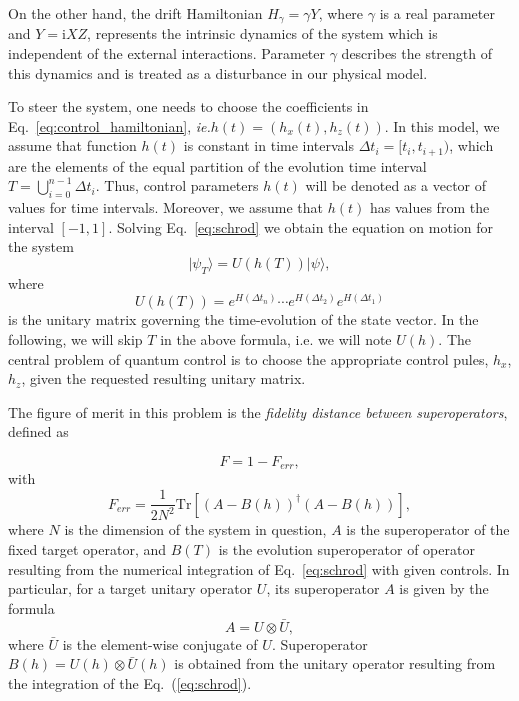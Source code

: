 \documentclass[aps,pra,showkeys,showpacs,notitlepage,superscriptaddress]{revtex4-1}
\newcommand{\Tr}{\mathrm{Tr}}
\newcommand{\tr}{\Tr}
\newcommand{\ket}[1]{\ensuremath{|#1\rangle}}
\newcommand{\1}{{\rm 1\hspace{-0.9mm}l}}
\newcommand{\ii}{\mathrm{i}}
\newcommand{\Sx}{X}
\newcommand{\Sz}{Z}
\newcommand{\Sy}{Y}
\newcommand{\ie}{\emph{ie.}\xspace}
\begin{document}
On the other hand, the drift Hamiltonian $H_{\gamma}=\gamma \Sy$, where 
$\gamma$ is a real parameter and  $\Sy=\ii\Sx \Sz$, represents the 
intrinsic dynamics of the system which is independent of the external 
interactions. Parameter $\gamma$ describes the strength of this dynamics and  is treated as a disturbance in 
our physical model.

To steer the system, one needs to choose the coefficients in 
Eq.~\eqref{eq:control_hamiltonian}, \ie $h(t) 
= (h_x(t),h_z(t))$. In this model, we assume that 
function $h(t)$ is constant in time intervals $\Delta t_i = 
[t_i,t_{i+1})$, which are the elements of the equal partition of the evolution time interval $T 
=\bigcup_{i=0}^{n-1}\Delta t_i$. Thus, control parameters $h(t)$ will be denoted as a vector of values for time 
intervals. Moreover, we assume that $h(t)$ has values 
from the interval $[ -1,1]$. 
Solving Eq.~\eqref{eq:schrod} we obtain the equation on motion for the system
\begin{equation}
\ket{\psi_T}=U(h(T))\ket{\psi},
\end{equation}
where
\begin{equation}
U(h(T))=e^{ H(\Delta t_n)}\cdots e^{ H(\Delta t_2)}e^{ H(\Delta t_1)}
\label{eq:integrate_superoperator}
\end{equation}
is the unitary matrix governing the time-evolution of the state vector. In the following, we will skip $T$ in the above formula, i.e. we will note $U(h)$. 
The central problem of quantum control is to choose the appropriate control 
pules, $h_x$, $h_z$, given the requested resulting unitary matrix.



The figure of merit in this problem is the \emph{fidelity distance between 
  superoperators}, defined as \cite{floether12robust}

\begin{equation}
F=1-F_{err},
\end{equation} 
with
\begin{equation}
F_{err} = \frac{1}{2N^2}  \tr \left[ (A-B(h))^\dagger (A-B(h))\right] ,
\label{eq:fidelity-error}
\end{equation} 
where $N$ is the dimension of the system in question, $A$ is the superoperator of 
the fixed target operator,
and $B(T)$ is the evolution superoperator of operator resulting from the numerical 
integration of Eq.~\eqref{eq:schrod}
with given controls.  In particular, for a target unitary operator $U$, its 
superoperator 
$A$ is given by the formula
\begin{equation}
A=U\otimes \bar{U},
\end{equation}
where $\bar{U}$ is the element-wise conjugate of $U$.
Superoperator $B(h)=U(h)\otimes \bar{U}(h)$ is obtained from the unitary operator resulting from the 
integration of the Eq.~(\ref{eq:schrod}).
\end{document}
